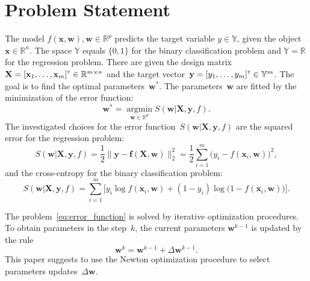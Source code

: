 \documentclass[a4paper,12pt]{article}
\theoremstyle{plain} %
\theoremstyle{definition} %
\theoremstyle{remark} %
\newcommand{\bw}{\mathbf{w}}
\newcommand{\by}{\mathbf{y}}
\newcommand{\bx}{\mathbf{x}}
\newcommand{\bbR}{\mathbb{R}}
\newcommand{\bbY}{\mathbb{Y}}
\newcommand{\bX}{\mathbf{X}}
\newcommand{\T}{{\text{\tiny\sffamily\upshape\mdseries T}}}
\newcommand{\argmin}{\mathop{\arg \min}\limits}
\begin{document}
	\section*{Problem Statement}

	The model $f( \bx, \bw), \bw \in \mathbb{R}^p$ predicts the target variable $y \in \bbY$, given the object $\bx \in \bbR^{n}$. The space $\bbY$ equals $\{0, 1\}$ for the binary classification problem and $\bbY = \bbR$ for the regression problem.
	There are given the design matrix~$\bX = [\bx_1, \dots, \bx_m]^{\T} \in \bbR^{m \times n}$ and the target vector~$\by = [y_1, \dots, y_m]^{\T} \in \bbY^{m}$. 
	The goal is to find the optimal parameters~$\bw^*$.
	The parameters~$\bw$ are fitted by the minimization of the error function:
	\begin{equation}
		\bw^* = \argmin_{\bw \in \bbR^p} S(\bw | \bX, \by, f).
		\label{eq:error_function}
	\end{equation}
	The investigated choices for the error function~$S(\bw | \bX, \by, f)$ are
	the squared error for the regression problem: 
	\begin{equation}
		S(\bw | \bX, \by, f) = \frac 12 \| \by - \mathbf{f}(\bX, \bw) \|_2^2 = \frac 12 \sum_{i=1}^m \bigl( y_i - f(\bx_i,  \bw)\bigr)^2,
		\label{eq:squared_error}
	\end{equation}
	 and the cross-entropy for the binary classification problem: 
	\begin{equation}
		S(\bw | \bX, \by, f) = \sum_{i=1}^m \bigl[y_i \log f (\bx_i , \bw) + (1-y_i) \log \bigl(1 - f (\bx_i , \bw)\bigr)\bigr].
		\label{eq:log_loss}
	\end{equation}
	
	The problem~\eqref{eq:error_function} is solved by iterative optimization procedures. 
	To obtain parameters in the step~$k$, the current parameters $\bw^{k-1}$ is updated by the rule
	\begin{equation}
		\bw^k = \bw^{k - 1} + \Delta \bw^{k - 1}.
		\label{eq:update_rule}
	\end{equation}
	This paper suggests to use the Newton optimization procedure to select parameters updates~$\Delta \bw$.
	
\end{document}

